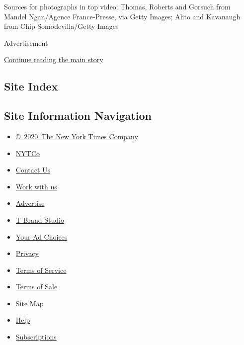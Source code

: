 Sources for photographs in top video: Thomas, Roberts and Gorsuch from
Mandel Ngan/Agence France-Presse, via Getty Images; Alito and Kavanaugh
from Chip Somodevilla/Getty Images

Advertisement

\protect\hyperlink{after-bottom}{Continue reading the main story}

\hypertarget{site-index}{%
\subsection{Site Index}\label{site-index}}

\hypertarget{site-information-navigation}{%
\subsection{Site Information
Navigation}\label{site-information-navigation}}

\begin{itemize}
\tightlist
\item
  \href{https://help.nytimes3xbfgragh.onion/hc/en-us/articles/115014792127-Copyright-notice}{©~2020~The
  New York Times Company}
\end{itemize}

\begin{itemize}
\tightlist
\item
  \href{https://www.nytco.com/}{NYTCo}
\item
  \href{https://help.nytimes3xbfgragh.onion/hc/en-us/articles/115015385887-Contact-Us}{Contact
  Us}
\item
  \href{https://www.nytco.com/careers/}{Work with us}
\item
  \href{https://nytmediakit.com/}{Advertise}
\item
  \href{http://www.tbrandstudio.com/}{T Brand Studio}
\item
  \href{https://www.nytimes3xbfgragh.onion/privacy/cookie-policy\#how-do-i-manage-trackers}{Your
  Ad Choices}
\item
  \href{https://www.nytimes3xbfgragh.onion/privacy}{Privacy}
\item
  \href{https://help.nytimes3xbfgragh.onion/hc/en-us/articles/115014893428-Terms-of-service}{Terms
  of Service}
\item
  \href{https://help.nytimes3xbfgragh.onion/hc/en-us/articles/115014893968-Terms-of-sale}{Terms
  of Sale}
\item
  \href{https://spiderbites.nytimes3xbfgragh.onion}{Site Map}
\item
  \href{https://help.nytimes3xbfgragh.onion/hc/en-us}{Help}
\item
  \href{https://www.nytimes3xbfgragh.onion/subscription?campaignId=37WXW}{Subscriptions}
\end{itemize}
